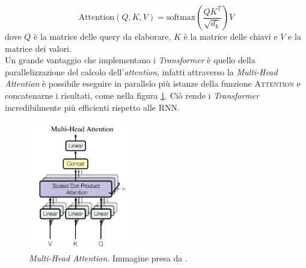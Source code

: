 \[\text{Attention}(Q,K,V)=\text{softmax}(\frac{QK^T}{\sqrt{d_k}})V\]
dove \(Q\) \`e la matrice delle query da elaborare,
\(K\) \`e la matrice delle chiavi e \(V\) e la matrice dei valori.\\
Un grande vantaggio che implementano i \emph{Transformer} \`e quello della parallelizzazione del calcolo dell'\emph{attention}, infatti attraverso la \emph{Multi-Head Attention} \`e possibile eseguire in parallelo pi\`u istanze della funzione \textsc{Attention} e concatenarne i risultati, come nella figura \ref{fig:multiHeadAttention}. Ci\`o rende i \emph{Transformer} incredibilmente pi\`u efficienti rispetto alle RNN.
\begin{figure}[H]
    \centering
    \includegraphics[width=0.4\textwidth]{media/1-introduzioneLLM/multiHeadAttention.png}
    \caption{\emph{Multi-Head Attention}. Immagine presa da \cite{vaswani2023attentionneed}.}
    \label{fig:multiHeadAttention}
\end{figure}

